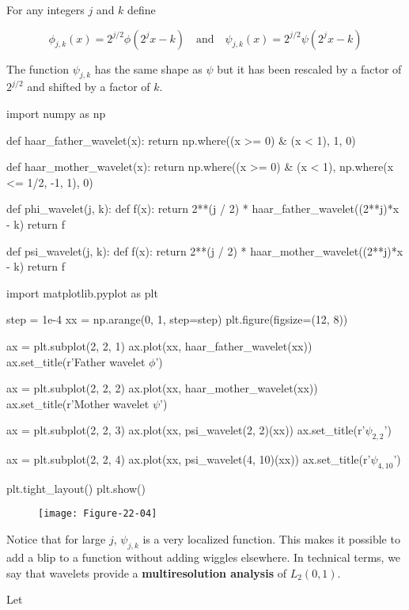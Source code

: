 For any integers \(j\) and \(k\) define

\[ \phi_{j, k}(x) = 2^{j/2} \phi(2^{j} x - k) 
\quad \text{and} \quad
\psi_{j, k}(x) = 2^{j/2} \psi(2^{j} x - k)
\]

The function \(\psi_{j, k}\) has the same shape as \(\psi\) but it has
been rescaled by a factor of \(2^{j/2}\) and shifted by a factor of
\(k\).

\begin{python}
import numpy as np

def haar_father_wavelet(x):
    return np.where((x >= 0) & (x < 1), 1, 0)

def haar_mother_wavelet(x):
    return np.where((x >= 0) & (x < 1),  np.where(x <= 1/2, -1, 1), 0)

def phi_wavelet(j, k):
    def f(x):
        return 2**(j / 2) * haar_father_wavelet((2**j)*x - k)
    return f

def psi_wavelet(j, k):
    def f(x):
        return 2**(j / 2) * haar_mother_wavelet((2**j)*x - k)
    return f
\end{python}

\begin{python}
import matplotlib.pyplot as plt

step = 1e-4
xx = np.arange(0, 1, step=step)
plt.figure(figsize=(12, 8))

ax = plt.subplot(2, 2, 1)
ax.plot(xx, haar_father_wavelet(xx))
ax.set_title(r'Father wavelet $\phi$')
    
ax = plt.subplot(2, 2, 2)
ax.plot(xx, haar_mother_wavelet(xx))
ax.set_title(r'Mother wavelet $\psi$')

ax = plt.subplot(2, 2, 3)
ax.plot(xx, psi_wavelet(2, 2)(xx))
ax.set_title(r'$\psi_{2, 2}$')

ax = plt.subplot(2, 2, 4)
ax.plot(xx, psi_wavelet(4, 10)(xx))
ax.set_title(r'$\psi_{4, 10}$')

plt.tight_layout()
plt.show()
\end{python}

\begin{figure}[H]
\centering
\texttt{[image: Figure-22-04]}
\end{figure}

Notice that for large \(j\), \(\psi_{j, k}\) is a very localized
function. This makes it possible to add a blip to a function without
adding wiggles elsewhere. In technical terms, we say that wavelets
provide a \textbf{multiresolution analysis} of \(L_{2}(0, 1)\).

Let

